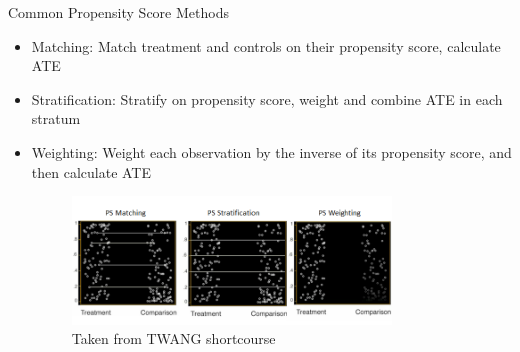 \begin{frame}{Common Propensity Score Methods}
\begin{itemize}
 \item Matching: Match treatment and controls on their propensity score, calculate ATE
 \item Stratification: Stratify on propensity score, weight and combine ATE in each stratum
 \item Weighting: Weight each observation by the inverse of its propensity score, and then calculate ATE
 
  \begin{figure}[h!]
  \centering
    \includegraphics[width=0.8\textwidth]{ps_examples.png}
    \caption{Taken from TWANG shortcourse \cite{Rand2015}}
\label{fig:psexamp}

\end{figure}
\end{itemize}
\end{frame}


